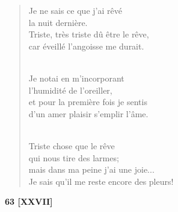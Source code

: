 \documentclass[a4paper,12pt]{book}
\begin{document}
\begin{verse}
Je ne sais ce que j'ai rêvé \\
la nuit dernière. \\
Triste, très triste dû être le rêve, \\
car éveillé l'angoisse me durait. \\ \


Je notai en m'incorporant \\
l'humidité de l'oreiller, \\
et pour la première fois je sentis \\
d'un amer plaisir s'emplir l'âme. \\ \

Triste chose que le rêve \\
qui nous tire des larmes; \\
mais dans ma peine j'ai une joie... \\
Je sais qu'il me reste encore des pleurs! \\
\end{verse}

\bigskip

\begin{center} {\bf 63 [XXVII]} \end{center}
\end{document}
